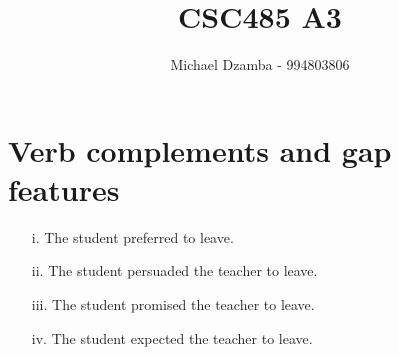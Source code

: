 \documentclass{article}
\author{Michael Dzamba - 994803806}
\title{CSC485 A3}
\begin{document}
\maketitle

\section{Verb complements and gap features}
\begin{enumerate}
\item[i.] The student preferred to leave.
\item[ii.] The student persuaded the teacher to leave.
\item[iii.] The student promised the teacher to leave.
\item[iv.] The student expected the teacher to leave.

\end{enumerate}
\end{document}
